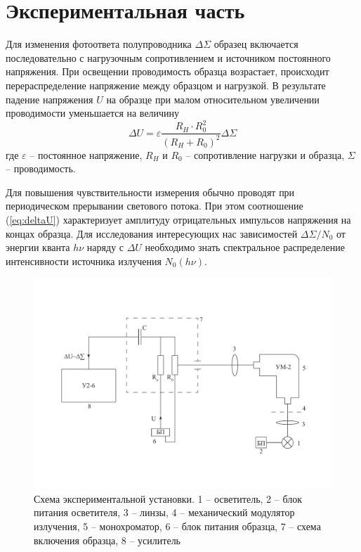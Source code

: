 \documentclass[a4paper, 12pt]{article}
\begin{document}
    \section{Экспериментальная часть}
    Для изменения фотоответа полупроводника $\Delta\Sigma$ образец включается последовательно с нагрузочным сопротивлением и источником постоянного напряжения. При освещении проводимость образца возрастает, происходит перераспределение напряжение между образцом и нагрузкой. В результате падение напряжения $U$ на образце при малом относительном увеличении проводимости уменьшается на величину
    \begin{equation}
        \Delta U=\varepsilon\frac{R_H\cdot R_0^2}{(R_H+R_0)^2}\Delta\Sigma
        \label{eq:deltaU}
    \end{equation}
    где $\varepsilon$ -- постоянное напряжение, $R_H$ и $R_0$ -- сопротивление нагрузки и образца, $\Sigma$ -- проводимость.

    Для повышения чувствительности измерения обычно проводят при периодическом прерывании светового потока. При этом соотношение (\ref{eq:deltaU}) характеризует амплитуду отрицательных импульсов напряжения на концах образца. Для исследования интересующих нас зависимостей $\Delta\Sigma/N_0$ от энергии кванта $h\nu$ наряду с $\Delta U$ необходимо знать спектральное распределение интенсивности источника излучения $N_0(h\nu)$.
    \begin{figure}[!htb]
        \centering
        \includegraphics[width=\textwidth]{exp_scheme.pdf}
        \caption{Схема экспериментальной установки. 1 -- осветитель, 2 -- блок питания осветителя, 3 -- линзы, 4 -- механический модулятор излучения, 5 -- монохроматор, 6 -- блок питания образца, 7 -- схема включения образца, 8 -- усилитель}
    \end{figure}
\end{document}
